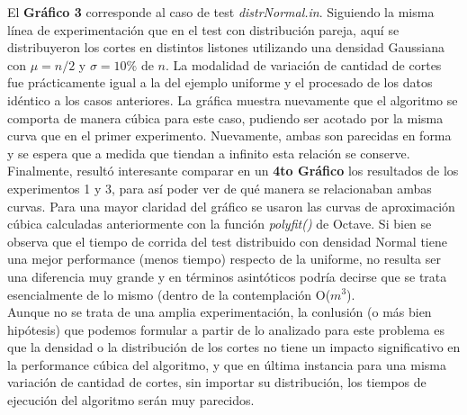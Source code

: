 \indent El \textbf{Gráfico 3} corresponde al caso de test \textit{distrNormal.in}. Siguiendo la misma línea de experimentación que en el test con distribución pareja, aquí se distribuyeron los cortes en distintos listones utilizando una densidad Gaussiana con $\mu = n/2$ y $\sigma = 10\%$ de $n$. La modalidad de variación de cantidad de cortes fue prácticamente igual a la del ejemplo uniforme y el procesado de los datos idéntico a los casos anteriores. La gráfica muestra nuevamente que el algoritmo se comporta de manera cúbica para este caso, pudiendo ser acotado por la misma curva que en el primer experimento. Nuevamente, ambas son parecidas en forma y se espera que a medida que tiendan a infinito esta relación se conserve.\\
\indent Finalmente, resultó interesante comparar en un \textbf{4to Gráfico} los resultados de los experimentos 1 y 3, para así poder ver de qué manera se relacionaban ambas curvas. Para una mayor claridad del gráfico se usaron las curvas de aproximación cúbica calculadas anteriormente con la función \textit{polyfit()} de Octave. Si bien se observa que el tiempo de corrida del test distribuido con densidad Normal tiene una mejor performance (menos tiempo) respecto de la uniforme, no resulta ser una diferencia muy grande y en términos asintóticos podría decirse que se trata esencialmente de lo mismo (dentro de la contemplación O($m^3$).\\
\indent Aunque no se trata de una amplia experimentación, la conlusión (o más bien hipótesis) que podemos formular a partir de lo analizado para este problema es que la densidad o la distribución de los cortes no tiene un impacto significativo en la performance cúbica del algoritmo, y que en última instancia para una misma variación de cantidad de cortes, sin importar su distribución, los tiempos de ejecución del algoritmo serán muy parecidos.\\
